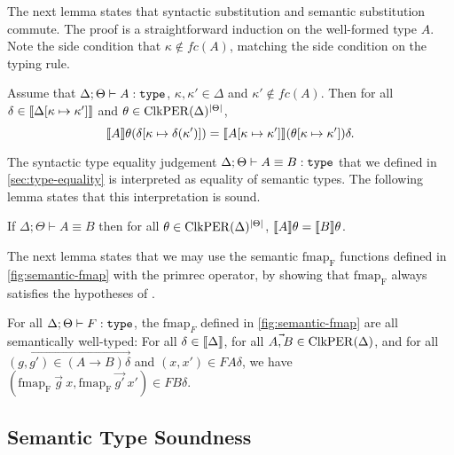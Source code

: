 The next lemma states that syntactic substitution and semantic
substitution commute. The proof is a straightforward induction on the
well-formed type $A$. Note the side condition that $\kappa \not\in
\mathit{fc}(A)$, matching the side condition on the
 typing rule.

\begin{lemma}\label{lem:substitution-lemma}
  Assume that $\Delta; \Theta \vdash A : \texttt{\textup{type}}$, $\kappa, \kappa'
  \in \Delta$ and $\kappa' \not\in \mathit{fc}(A)$. Then for all
  $\delta \in \llbracket \Delta[\kappa\mapsto\kappa'] \rrbracket$ and $\theta \in
  \mathrm{ClkPER}(\Delta)^{|\Theta|}$,
  \begin{displaymath}
    \llbracket A \rrbracket\theta (\delta[\kappa \mapsto \delta(\kappa')]) = \llbracket A[\kappa\mapsto\kappa'] \rrbracket(\theta[\kappa\mapsto\kappa'])\delta.
  \end{displaymath}
\end{lemma}

The syntactic type equality judgement $\Delta; \Theta \vdash A \equiv
B : \texttt{\textup{type}}$ that we defined in \autoref{sec:type-equality} is
interpreted as equality of semantic types. The following lemma states
that this interpretation is sound.

\begin{lemma}\label{lem:type-equality}
  If $\Delta; \Theta \vdash A \equiv B$ then for all $\theta \in
  \mathrm{ClkPER}(\Delta)^{|\Theta|}$, $\llbracket A \rrbracket\theta = \llbracket B \rrbracket\theta$.
\end{lemma}

The next lemma states that we may use the semantic $\mathrm{fmap_F}$
functions defined in \autoref{fig:semantic-fmap} with the
$\mathrm{primrec}$ operator, by showing that $\mathrm{fmap_F}$ always
satisfies the hypotheses of .

\begin{lemma}\label{lem:sem-fmap-well-typed}
  For all $\Delta; \Theta \vdash F : \texttt{\textup{type}}$, the $\mathrm{fmap}_F$
  defined in \autoref{fig:semantic-fmap} are all semantically
  well-typed: For all $\delta \in \llbracket \Delta \rrbracket$, for all $\vec{A,B}
  \in \mathrm{ClkPER}(\Delta)$, and for all $\vec{(g,g') \in (A \to B)\delta}$
  and $(x,x') \in FA\delta$, we have $(\mathrm{fmap_F}\ \vec{g}\ x,
  \mathrm{fmap_F}\ \vec{g'}\ x') \in FB\delta$.
\end{lemma}

\subsection{Semantic Type Soundness}\label{sec:semantic-soundness}


